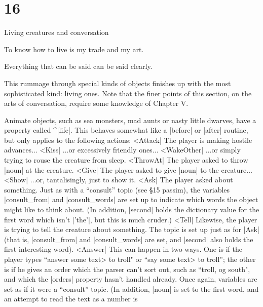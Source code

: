 \section{16}{Living creatures and conversation}

\widepoem
To know how to live is my trade and my art.

\widepoem
Everything that can be said can be said clearly.

\noindent
This rummage through special kinds of objects finishes up with the most
sophisticated kind: living ones.  Note that the finer points of this
section, on the arts of conversation, require some knowledge of Chapter
V.

Animate objects, such as sea monsters, mad aunts or nasty little dwarves,
have a property called ^|life|.  This behaves somewhat like a |before|
or |after| routine, but only applies to the following actions:
\medskip
\stepin=60pt
^^|Attack|%
The player is making hostile advances$\ldots$
\medskip
{}^^|Kiss|%
$\ldots$or excessively friendly ones$\ldots$
\medskip
{}^^|WakeOther|%
$\ldots$or simply trying to rouse the creature from sleep.
\medskip
{}^^|ThrowAt|%
The player asked to throw |noun| at the creature.
\medskip
{}^^|Give|%
The player asked to give |noun| to the creature$\ldots$
\medskip
{}^^|Show|%
$\ldots$or, tantalisingly, just to show it.
\medskip
{}^^|Ask|%
The player asked about something.  Just as with a ``consult''
topic (see \S 15 passim), the variables |consult_from|
and |consult_words| are set up to indicate which words the
object might like to think about.  (In addition, |second|
holds the dictionary value for the first word which isn't
|'the'|, but this is much cruder.)
\medskip
{}^^|Tell|%
Likewise, the player is trying to tell the creature about
something.  The topic is set up just as for |Ask| (that is,
|consult_from| and |consult_words| are set, and |second|
also holds the first interesting word).
^^|Answer|%
This can happen in two ways.  One is if the player types ``answer \<some text>
to troll" or ``say \<some text> to troll''; the other is if he gives an
order which the parser can't sort out, such as
``troll, og south", and which the |orders| property hasn't handled
already.  Once again, variables are set as if it
were a ``consult'' topic.  (In addition, |noun| is set to the
first word, and an attempt to read the text as a number is
